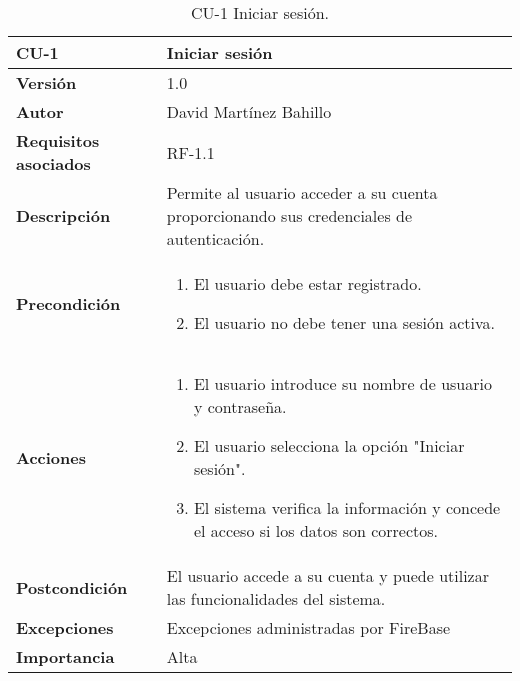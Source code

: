 \begin{table}[p]
	\centering
	\begin{tabularx}{\linewidth}{ p{} p{} }
		\toprule
		\textbf{CU-1}    & \textbf{Iniciar sesión}\\
		\toprule
		\textbf{Versión}              & 1.0    \\
		\textbf{Autor}                & David Martínez Bahillo \\
		\textbf{Requisitos asociados} & RF-1.1 \\
		\textbf{Descripción}          & Permite al usuario acceder a su cuenta proporcionando sus credenciales de autenticación. \\
		\textbf{Precondición}         &  
		\begin{enumerate}
		\def\labelenumi{\arabic{enumi}.}
			\tightlist
			\item El usuario debe estar registrado.
			\item El usuario no debe tener una sesión activa.
		\end{enumerate}\\
		\textbf{Acciones}             &
		\begin{enumerate}
			\def\labelenumi{\arabic{enumi}.}
			\tightlist
			\item El usuario introduce su nombre de usuario y contraseña.
			\item El usuario selecciona la opción "Iniciar sesión".
			\item El sistema verifica la información y concede el acceso si los datos son correctos.
		\end{enumerate}\\
		\textbf{Postcondición}        & El usuario accede a su cuenta y puede utilizar las funcionalidades del sistema. \\
		\textbf{Excepciones}          & Excepciones administradas por FireBase \\
		\textbf{Importancia}          & Alta  \\
		\bottomrule
	\end{tabularx}
	\caption{CU-1 Iniciar sesión.}
\end{table}




